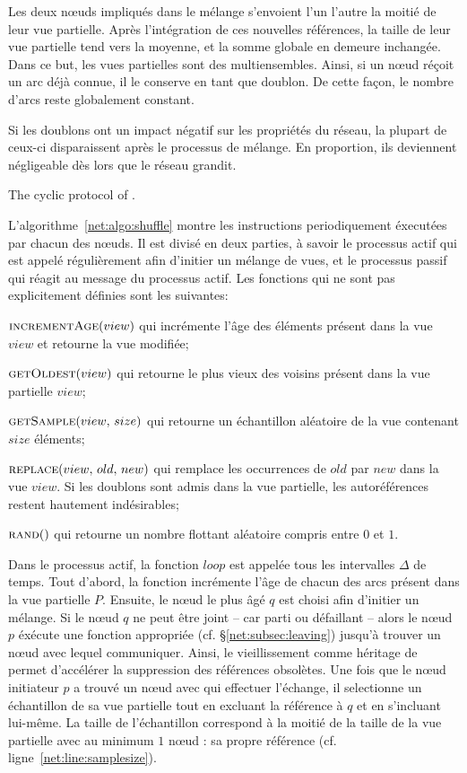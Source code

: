 Les deux nœuds impliqués dans le mélange s'envoient l'un l'autre la moitié de
leur vue partielle. Après l'intégration de ces nouvelles références, la taille
de leur vue partielle tend vers la moyenne, et la somme globale en demeure
inchangée. Dans ce but, les vues partielles sont des multiensembles. Ainsi, si
un nœud réçoit un arc déjà connue, il le conserve en tant que doublon.  De cette
façon, le nombre d'arcs reste globalement constant.

Si les doublons ont un impact négatif sur les propriétés du réseau, la plupart
de ceux-ci disparaissent après le processus de mélange. En proportion, ils
deviennent négligeable dès lors que le réseau grandit.

\begin{algorithm}[h]
  
  \caption{\label{net:algo:shuffle}The cyclic protocol of \SPRAY.}
\end{algorithm}

L'algorithme~\ref{net:algo:shuffle} montre les instructions periodiquement
éxecutées par chacun des nœuds. Il est divisé en deux parties, à savoir le
processus actif qui est appelé régulièrement afin d'initier un mélange de vues,
et le processus passif qui réagit au message du processus actif. Les fonctions
qui ne sont pas explicitement définies sont les suivantes:
\begin{inparaenum}[]
\item $\textsc{incrementAge}(view)$ qui incrémente l'âge des éléments présent
  dans la vue $view$ et retourne la vue modifiée;
\item $\textsc{getOldest}(view)$ qui retourne le plus vieux des voisins présent
  dans la vue partielle $view$;
\item $\textsc{getSample}(view,\, size)$ qui retourne un échantillon aléatoire
  de la vue contenant $size$ éléments;
\item $\textsc{replace}(view,\,old,\,new)$ qui remplace les occurrences de $old$
  par $new$ dans la vue $view$. Si les doublons sont admis dans la vue
  partielle, les autoréférences restent hautement indésirables;
\item $\textsc{rand}()$ qui retourne un nombre flottant aléatoire compris entre
  $0$ et $1$.
\end{inparaenum}

Dans le processus actif, la fonction $loop$ est appelée tous les intervalles
$\Delta$ de temps. Tout d'abord, la fonction incrémente l'âge de chacun des arcs
présent dans la vue partielle $P$. Ensuite, le nœud le plus âgé $q$ est choisi
afin d'initier un mélange. Si le nœud $q$ ne peut être joint -- car parti ou
défaillant -- alors le nœud $p$ éxécute une fonction appropriée (cf.
§\ref{net:subsec:leaving}) jusqu'à trouver un nœud avec lequel
communiquer. Ainsi, le vieillissement comme héritage de \CYCLON permet
d'accélérer la suppression des références obsolètes. Une fois que le nœud
initiateur $p$ a trouvé un nœud avec qui effectuer l'échange, il selectionne un
échantillon de sa vue partielle tout en excluant la référence à $q$ et en
s'incluant lui-même. La taille de l'échantillon correspond à la moitié de la
taille de la vue partielle avec au minimum $1$ nœud : sa propre référence
(cf. ligne~\ref{net:line:samplesize}).


